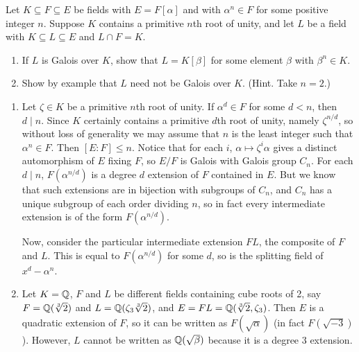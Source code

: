 %
\begin{question}[subtitle=August 2011 Problem 3,ID=Aug11_3] %
Let $K\subseteq F\subseteq E$ be fields with $E=F[\alpha]$ and with $\alpha^n \in F$ for some positive integer $n$. Suppose $K$ contains a primitive $n$th root of unity, and let $L$ be a field with $K\subseteq L \subseteq E$ and $L\cap F=K$.
\begin{enumerate}
    \item If $L$ is Galois over $K$, show that $L=K[\beta]$ for some element $\beta$  with $\beta^n \in K$.
    \item Show by example that $L$ need not be Galois over $K$. (Hint. Take $n= 2$.)
\end{enumerate}
\end{question}
\begin{solution}
\begin{enumerate}
    \item Let $\zeta \in K$ be a primitive $n$th root of unity. If $\alpha^d \in F$ for some $d < n$, then $d \mid n$. Since $K$ certainly contains a primitive $d$th root of unity, namely $\zeta^{n/d}$, so without loss of generality we may assume that $n$ is the least integer such that $\alpha^n \in F$. Then $[E:F] \leq n$. Notice that for each $i$, $\alpha \mapsto \zeta^i \alpha$ gives a distinct automorphism of $E$ fixing $F$, so $E/F$ is Galois with Galois group $C_n$. For each $d \mid n$, $F(\alpha^{n/d})$ is a degree $d$ extension of $F$ contained in $E$. But we know that such extensions are in bijection with subgroups of $C_n$, and $C_n$ has a unique subgroup of each order dividing $n$, so in fact every intermediate extension is of the form $F(\alpha^{n/d})$.
    
    Now, consider the particular intermediate extension $FL$, the composite of $F$ and $L$. This is equal to $F(\alpha^{n/d})$ for some $d$, so is the splitting field of $x^d - \alpha^n$. 
    \item Let $K = \mathbb{Q}$, $F$ and $L$ be different fields containing cube roots of 2, say $F = \mathbb{Q}(\sqrt[3]{2})$ and $L = \mathbb{Q}(\zeta_3 \sqrt[3]{2})$, and $E = FL = \mathbb{Q}(\sqrt[3]{2},\zeta_3)$. Then $E$ is a quadratic extension of $F$, so it can be written as $F(\sqrt{\alpha})$ (in fact $F(\sqrt{-3})$). However, $L$ cannot be written as $\mathbb{Q}(\sqrt{\beta})$ because it is a degree 3 extension.
\end{enumerate}
\end{solution}